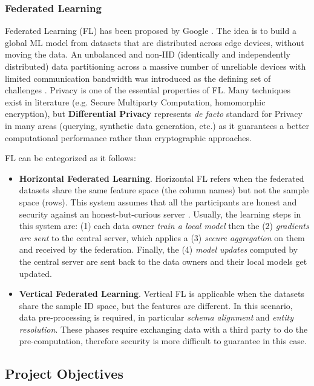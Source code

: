 \documentclass[12pt]{article}
\begin{document}
\subsubsection{Federated Learning}
Federated Learning (FL) has been proposed by Google \cite*{Kon2016}. The idea is to build a global ML model from datasets that are 
distributed across edge devices, without moving the data. 
An unbalanced and non-IID (identically and independently distributed) data partitioning across a massive number of unreliable 
devices with limited communication bandwidth was introduced as the defining set of challenges \cite*{Kairouz2021}.
Privacy is one of the essential properties of FL. Many techniques exist in literature (e.g. Secure Multiparty Computation, homomorphic encryption), but 
\textbf{Differential Privacy} represents \textit{de facto} standard for Privacy in many areas (querying, synthetic data generation, etc.) as it guarantees a 
better computational performance rather than cryptographic approaches.

FL can be categorized as it follows: 
\begin{itemize}
   \item \textbf{Horizontal Federated Learning}. Horizontal FL refers when the federated datasets share the same feature space (the column names) but not the sample space (rows). This system
   assumes that all the participants are honest and security against an honest-but-curious server \cite*{Yang2019}. Usually, the learning steps in this system are: (1) 
   each data owner \textit{train a local model} then the (2) \textit{gradients are sent} to the central server, which applies a (3) \textit{secure aggregation} on them and  
   received by the federation. Finally, the (4) \textit{model updates} computed by the central server are sent back to the data owners and their local models get updated.
   \item \textbf{Vertical Federated Learning}. Vertical FL is applicable when the datasets share the sample ID space, but the features are different. In this scenario, data pre-processing is required, in particular 
   \textit{schema alignment} and \textit{entity resolution}. These phases require exchanging data with a third party to do the pre-computation, therefore security is more difficult to guarantee in this case.
\end{itemize}

\subsection{Project Objectives}
\end{document}

